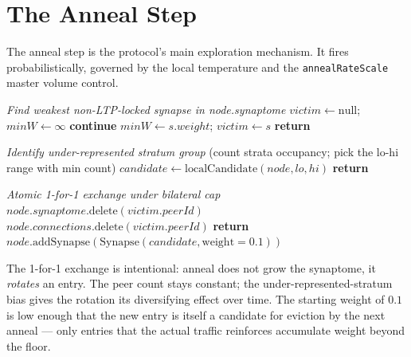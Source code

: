 \documentclass[twoside,nobib]{tufte-book}
\begin{document}
\section{The Anneal Step}

The anneal step is the protocol's main exploration mechanism. It
fires probabilistically, governed by the local temperature and
the \texttt{annealRateScale} master volume control.

\begin{algorithm}
\caption{tryAnneal(node)}
\begin{algorithmic}[1]
\State \emph{Find weakest non-LTP-locked synapse in node.synaptome}
\State $\mathit{victim} \gets \mathrm{null}$;
       $\mathit{minW} \gets \infty$
   \textbf{continue}
  \EndIf
    $\mathit{minW} \gets s.\mathit{weight}$;
    $\mathit{victim} \gets s$
  \EndIf
\EndFor
{} \textbf{return} \EndIf

\State \emph{Identify under-represented stratum group}
\State (count strata occupancy; pick the lo-hi range with min count)
\State $\mathit{candidate} \gets \mathrm{localCandidate}(\mathit{node},
       \mathit{lo}, \mathit{hi})$
 \textbf{return} \EndIf

\State \emph{Atomic 1-for-1 exchange under bilateral cap}
\State $\mathit{node}.\mathit{synaptome}.\mathrm{delete}(\mathit{victim}.\mathit{peerId})$
\State $\mathit{node}.\mathit{connections}.\mathrm{delete}(\mathit{victim}.\mathit{peerId})$
  \textbf{return}
\EndIf
\State $\mathit{node}.\mathrm{addSynapse}(\mathrm{Synapse}(\mathit{candidate},
       \mathrm{weight}=0.1))$
\end{algorithmic}
\end{algorithm}

The 1-for-1 exchange is intentional: anneal does not grow the
synaptome, it \emph{rotates} an entry. The peer count stays
constant; the under-represented-stratum bias gives the rotation
its diversifying effect over time. The starting weight of $0.1$
is low enough that the new entry is itself a candidate for
eviction by the next anneal --- only entries that the actual
traffic reinforces accumulate weight beyond the floor.
\end{document}
